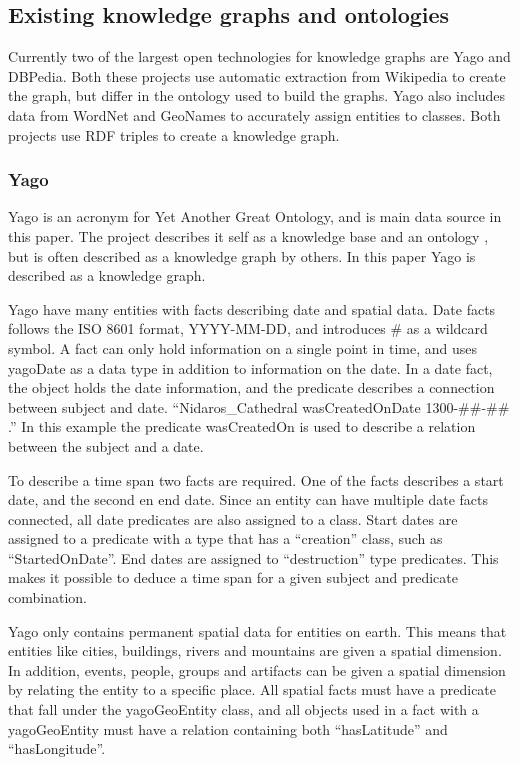 \subsection{Existing knowledge graphs and ontologies}
Currently two of the largest open technologies for knowledge graphs are Yago and DBPedia. Both these projects use automatic extraction from Wikipedia to create the graph, but differ in the ontology used to build the graphs. Yago also includes data from WordNet and GeoNames to accurately assign entities to classes. Both projects use RDF triples to create a knowledge graph.

\subsubsection{Yago}
Yago is an acronym for Yet Another Great Ontology, and is main data source in this paper. The project describes it self as a knowledge base\citep{yago} and an ontology \citep{mahdisoltani:hal-01699874}, but is often described as a knowledge graph by others. In this paper Yago is described as a knowledge graph.

Yago have many entities with facts describing date and spatial data.\citep{yago} Date facts follows the ISO 8601 format, YYYY-MM-DD, and introduces \# as a wildcard symbol. A fact can only hold information on a single point in time, and uses yagoDate as a data type in addition to information on the date.\citep{yago} In a date fact, the object holds the date information, and the predicate describes a connection between subject and date. ``Nidaros\_Cathedral wasCreatedOnDate 1300-\#\#-\#\# .'' In this example the predicate wasCreatedOn is used to describe a relation between the subject and a date.

To describe a time span two facts are required. One of the facts describes a start date, and the second en end date. Since an entity can have multiple date facts connected, all date predicates are also assigned to a class. Start dates are assigned to a predicate with a type that has a ``creation'' class, such as ``StartedOnDate''. End dates are assigned to ``destruction'' type predicates. This makes it possible to deduce a time span for a given subject and predicate combination.\citep{yago}

Yago only contains permanent spatial data for entities on earth. This means that entities like cities, buildings, rivers and mountains are given a spatial dimension. In addition, events, people, groups and artifacts can be given a spatial dimension by relating the entity to a specific place. All spatial facts must have a predicate that fall under the yagoGeoEntity class, and all objects used in a fact with a yagoGeoEntity must have a relation containing both ``hasLatitude'' and ``hasLongitude''.

